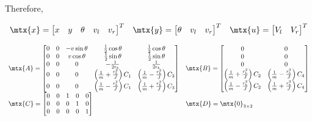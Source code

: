Therefore,

\begin{theorem}
  \label{thm:ltv_diff_drive_model}
  \begin{equation*}
    \begin{array}{ccc}
      \mtx{x} =
      \begin{bmatrix}
        x & y & \theta & v_l & v_r
      \end{bmatrix}^T &
      \mtx{y} =
      \begin{bmatrix}
        \theta & v_l & v_r
      \end{bmatrix}^T &
      \mtx{u} =
      \begin{bmatrix}
        V_l & V_r
      \end{bmatrix}^T
    \end{array}
  \end{equation*}

  \begin{equation}
    \begin{array}{ll}
      \mtx{A} =
      \begin{bmatrix}
        0 & 0 & -v\sin\theta & \frac{1}{2}\cos\theta & \frac{1}{2}\cos\theta \\
        0 & 0 & v\cos\theta & \frac{1}{2}\sin\theta & \frac{1}{2}\sin\theta \\
        0 & 0 & 0 & -\frac{1}{2r_b} & \frac{1}{2r_b} \\
        0 & 0 & 0 & \left(\frac{1}{m} + \frac{r_b^2}{J}\right) C_1 &
          \left(\frac{1}{m} - \frac{r_b^2}{J}\right) C_3 \\
        0 & 0 & 0 & \left(\frac{1}{m} - \frac{r_b^2}{J}\right) C_1 &
          \left(\frac{1}{m} + \frac{r_b^2}{J}\right) C_3
      \end{bmatrix} &
      \mtx{B} =
      \begin{bmatrix}
        0 & 0 \\
        0 & 0 \\
        0 & 0 \\
        \left(\frac{1}{m} + \frac{r_b^2}{J}\right) C_2 &
        \left(\frac{1}{m} - \frac{r_b^2}{J}\right) C_4 \\
        \left(\frac{1}{m} - \frac{r_b^2}{J}\right) C_2 &
        \left(\frac{1}{m} + \frac{r_b^2}{J}\right) C_4
      \end{bmatrix} \\
      \mtx{C} =
      \begin{bmatrix}
        0 & 0 & 1 & 0 & 0 \\
        0 & 0 & 0 & 1 & 0 \\
        0 & 0 & 0 & 0 & 1
      \end{bmatrix} &
      \mtx{D} = \mtx{0}_{3 \times 2}
    \end{array}
  \end{equation}


\end{theorem}
